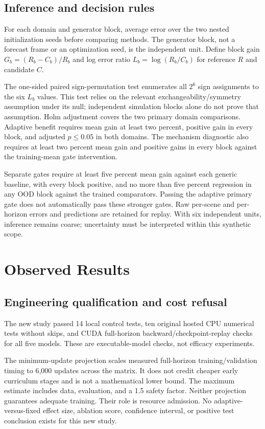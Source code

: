 \documentclass[10pt]{article}
\begin{document}
\subsection{Inference and decision rules}
For each domain and generator block, average error over the two nested initialization seeds before comparing methods. The generator block, not a forecast frame or an optimization seed, is the independent unit. Define block gain $G_b=(R_b-C_b)/R_b$ and log error ratio $L_b=\log(R_b/C_b)$ for reference $R$ and candidate $C$.

The one-sided paired sign-permutation test enumerates all $2^6$ sign assignments to the six $L_b$ values. This test relies on the relevant exchangeability/symmetry assumption under its null; independent simulation blocks alone do not prove that assumption. Holm adjustment covers the two primary domain comparisons. Adaptive benefit requires mean gain at least two percent, positive gain in every block, and adjusted $p\le0.05$ in both domains. The mechanism diagnostic also requires at least two percent mean gain and positive gains in every block against the training-mean gate intervention.

Separate gates require at least five percent mean gain against each generic baseline, with every block positive, and no more than five percent regression in any OOD block against the trained comparators. Passing the adaptive primary gate does not automatically pass these stronger gates. Raw per-scene and per-horizon errors and predictions are retained for replay. With six independent units, inference remains coarse; uncertainty must be interpreted within this synthetic scope.

\section{Observed Results}
\subsection{Engineering qualification and cost refusal}
The new study passed 14 local control tests, ten original hosted CPU numerical tests without skips, and CUDA full-horizon backward/checkpoint-replay checks for all five models. These are executable-model checks, not efficacy experiments.



The minimum-update projection scales measured full-horizon training/validation timing to 6,000 updates across the matrix. It does not credit cheaper early curriculum stages and is not a mathematical lower bound. The maximum estimate includes data, evaluation, and a 1.5 safety factor. Neither projection guarantees adequate training. Their role is resource admission. No adaptive-versus-fixed effect size, ablation score, confidence interval, or positive test conclusion exists for this new study.
\end{document}

